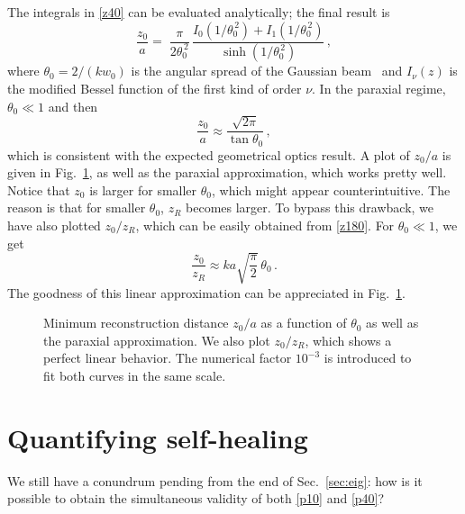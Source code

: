 \documentclass[10pt]{article}
\begin{document}
The integrals in \eqref{z40} can be  evaluated analytically; the final
result is
\begin{equation}
  \label{z180}
  \frac{z_0}{a} =  \; \frac{\pi}{2 \theta_0^{\, 2}} \,
  \frac{I_0(1/\theta_0^{\, 2}) + I_1(1/\theta_0^{\, 2})}
  {\sinh ( 1/\theta_0^{\, 2} )} \, ,  
\end{equation}
where $\theta_0 = 2/(k w_0)$ is the angular spread of the Gaussian
beam~\cite{Mandel:1995aa} and $I_\nu(z)$ is the modified Bessel
function of the first kind of order $\nu$. In the paraxial regime,
$\theta_0 \ll 1$ and then
\begin{equation}
  \label{z190}
  \frac{z_0}{a}  \approx  \frac{\sqrt{2\pi}}{\tan \theta_0} \, ,
\end{equation}
which is consistent with the expected geometrical optics result.  A
plot of ${z_0}/{a}$ is given in Fig.~\ref{fig3}, as well as the
paraxial approximation, which works pretty well. Notice that $z_{0}$
is larger for smaller $\theta_{0}$, which might appear
counterintuitive. The reason is that for smaller $\theta_{0}$,
$z_{R}$ becomes larger. To bypass this drawback, we  have also plotted
$z_{0}/z_{R}$, which can be easily obtained from \eqref{z180}. For
$\theta_0 \ll 1$, we get 
\begin{equation}
  \label{z190}
  \frac{z_0}{z_{R}}  \approx ka  \sqrt{\frac{\pi}{2}} \, \theta_{0} \, .
\end{equation}
The goodness of this linear approximation can be appreciated in
Fig.~\ref{fig3}.  

\begin{figure}[t]
  \caption{\label{fig3} Minimum reconstruction distance $z_0/a$ as
    a function of $\theta_{0}$ as well as the paraxial
    approximation. We also plot $z_{0}/z_{R}$, which shows a perfect
    linear behavior. The numerical factor $10^{-3}$ is introduced to
    fit both curves in the same scale. }
\end{figure}



\section{Quantifying self-healing}

We still have a conundrum pending from the end of Sec.~\ref{sec:eig}:
how is it possible to obtain the simultaneous validity of both
\eqref{p10} and \eqref{p40}?
\end{document}
